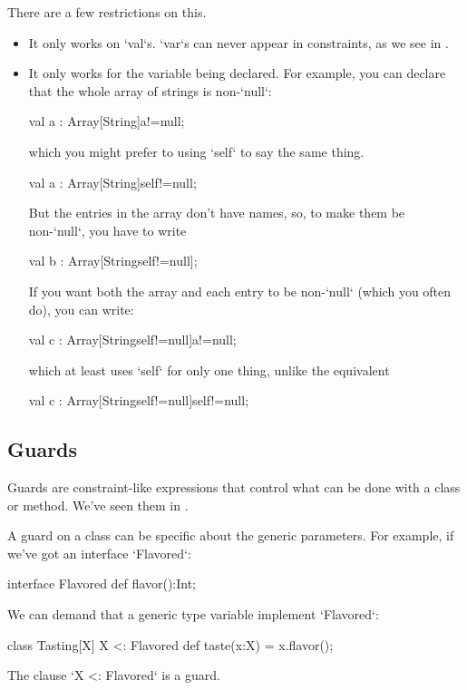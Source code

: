 There are a few restrictions on this.  
\begin{itemize}

\item It only works on \xcd`val`s.  \xcd`var`s can never appear in
      constraints, as we see in .

\item It only works for the variable being declared.  For example, 
you can declare that the whole array of strings is non-\xcd`null`: 
\begin{xten}
val a : Array[String]{a!=null};
\end{xten}
which you might prefer to using \xcd`self` to say the same thing.
\begin{xten}
val a : Array[String]{self!=null};
\end{xten}

But the entries in the array don't have names, so, to make them be
non-\xcd`null`,  you have to write
\begin{xten}
val b : Array[String{self!=null}];
\end{xten}

If you want both the array and each entry to be non-\xcd`null` (which you
often do), you can write: 
\begin{xten}
val c : Array[String{self!=null}]{a!=null};
\end{xten}
which at least uses \xcd`self` for only one thing, unlike the equivalent 
\begin{xten}
val c : Array[String{self!=null}]{self!=null};
\end{xten}

\end{itemize}

\subsection{Guards}
\label{sect:Guards}

Guards are constraint-like expressions that control what can be done with a
class or method.  We've seen them in .  

A guard on a class can be specific about the generic parameters.   For
example, if we've got an interface \xcd`Flavored`: 
\begin{xtennum}[]
interface Flavored {
  def flavor():Int;
}
\end{xtennum}
We can demand that a generic type variable implement \xcd`Flavored`: 
\begin{xtennum}[]
class Tasting[X] {X <: Flavored} {
   def taste(x:X) = x.flavor();
}
\end{xtennum}
The clause \xcd`{X <: Flavored}` is a guard.

